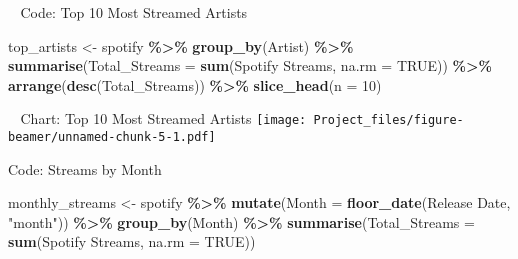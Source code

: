 \documentclass[
  ignorenonframetext,
]{beamer}
\newenvironment{Shaded}{\begin{snugshade}}{\end{snugshade}}
\newcommand{\AttributeTok}[1]{\textcolor[rgb]{0.13,0.29,0.53}{#1}}
\newcommand{\ConstantTok}[1]{\textcolor[rgb]{0.56,0.35,0.01}{#1}}
\newcommand{\DecValTok}[1]{\textcolor[rgb]{0.00,0.00,0.81}{#1}}
\newcommand{\FunctionTok}[1]{\textcolor[rgb]{0.13,0.29,0.53}{\textbf{#1}}}
\newcommand{\NormalTok}[1]{#1}
\newcommand{\OtherTok}[1]{\textcolor[rgb]{0.56,0.35,0.01}{#1}}
\newcommand{\SpecialCharTok}[1]{\textcolor[rgb]{0.81,0.36,0.00}{\textbf{#1}}}
\newcommand{\StringTok}[1]{\textcolor[rgb]{0.31,0.60,0.02}{#1}}
\begin{document}
\begin{frame}[fragile]{👩‍🎤 Code: Top 10 Most Streamed Artists}
\label{code-top-10-most-streamed-artists}
\begin{Shaded}
\begin{Highlighting}[]
\NormalTok{  top\_artists }\OtherTok{\textless{}{-}}\NormalTok{ spotify }\SpecialCharTok{\%\textgreater{}\%}
  \FunctionTok{group\_by}\NormalTok{(Artist) }\SpecialCharTok{\%\textgreater{}\%}
  \FunctionTok{summarise}\NormalTok{(}\AttributeTok{Total\_Streams =} \FunctionTok{sum}\NormalTok{(}\StringTok{\textasciigrave{}}\AttributeTok{Spotify Streams}\StringTok{\textasciigrave{}}\NormalTok{, }\AttributeTok{na.rm =} \ConstantTok{TRUE}\NormalTok{)) }\SpecialCharTok{\%\textgreater{}\%}
  \FunctionTok{arrange}\NormalTok{(}\FunctionTok{desc}\NormalTok{(Total\_Streams)) }\SpecialCharTok{\%\textgreater{}\%}
  \FunctionTok{slice\_head}\NormalTok{(}\AttributeTok{n =} \DecValTok{10}\NormalTok{)}
\end{Highlighting}
\end{Shaded}
\end{frame}

\begin{frame}{👩‍🎤 Chart: Top 10 Most Streamed Artists}
\label{chart-top-10-most-streamed-artists}
\texttt{[image: Project\_files/figure-beamer/unnamed-chunk-5-1.pdf]}
\end{frame}

\begin{frame}[fragile]{Code: Streams by Month}
\label{code-streams-by-month}
\begin{Shaded}
\begin{Highlighting}[]
\NormalTok{  monthly\_streams }\OtherTok{\textless{}{-}}\NormalTok{ spotify }\SpecialCharTok{\%\textgreater{}\%}
  \FunctionTok{mutate}\NormalTok{(}\AttributeTok{Month =} \FunctionTok{floor\_date}\NormalTok{(}\StringTok{\textasciigrave{}}\AttributeTok{Release Date}\StringTok{\textasciigrave{}}\NormalTok{, }\StringTok{"month"}\NormalTok{)) }\SpecialCharTok{\%\textgreater{}\%}
  \FunctionTok{group\_by}\NormalTok{(Month) }\SpecialCharTok{\%\textgreater{}\%}
  \FunctionTok{summarise}\NormalTok{(}\AttributeTok{Total\_Streams =} \FunctionTok{sum}\NormalTok{(}\StringTok{\textasciigrave{}}\AttributeTok{Spotify Streams}\StringTok{\textasciigrave{}}\NormalTok{, }\AttributeTok{na.rm =} \ConstantTok{TRUE}\NormalTok{))}
\end{Highlighting}
\end{Shaded}
\end{frame}
\end{document}
